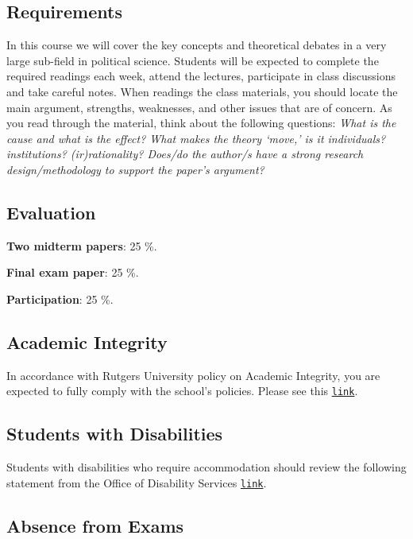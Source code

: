 \documentclass[letterpaper]{article}
\renewenvironment{itemize}{
  \begin{list}{}{
    \setlength{\leftmargin}{1.5em}
  }
}{
  \end{list}
}
\begin{document}
\subsection*{Requirements}

In this course we will cover the key concepts and theoretical debates in a very large sub-field in political science. Students will be expected to complete the required readings each week, attend the lectures, participate in class discussions and take careful notes. When readings the class materials, you should locate the main argument, strengths, weaknesses, and other issues that are of concern. As you read through the material, think about the following questions: \emph{What is the cause and what is the effect? What makes the theory `move,' is it individuals? institutions? (ir)rationality? Does/do the author/s have a strong research design/methodology to support the paper's argument?}


\subsection*{Evaluation}


\begin{itemize}
	\item[$\bullet$] {\bf Two midterm papers}: 25 \%.
	\item[$\bullet$] {\bf Final exam paper}: 25 \%.
	\item[$\bullet$] {\bf Participation}: 25 \%.
\end{itemize}


\subsection*{Academic Integrity}
In accordance with Rutgers University policy on Academic Integrity, you are expected to fully comply with the school's policies.  Please see this \href{http://academicintegrity.rutgers.edu}{\texttt{link}}.


\subsection*{Students with Disabilities}
Students with disabilities who require accommodation should review the following statement from the Office of Disability Services \href{https://ods.rutgers.edu/faculty/syllabus}{\texttt{link}}.


\subsection*{Absence from Exams}
\end{document}
